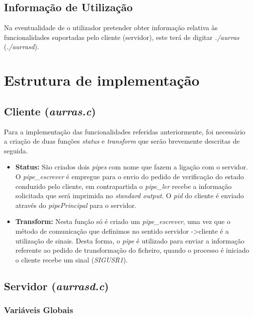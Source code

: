 \documentclass[11pt,a4paper]{report}
\begin{document}
\section{Informação de Utilização}

Na eventualidade de o utilizador pretender obter informação relativa às funcionalidades suportadas pelo cliente (servidor), este terá de digitar \emph{./aurras} (\emph{./aurrasd}). 

\chapter{Estrutura de implementação}

\section{Cliente (\emph{aurras.c})}

Para a implementação das funcionalidades referidas anteriormente, foi necessário a criação de duas funções \emph{status} e \emph{transform} que serão brevemente descritas de seguida.

\begin{itemize}
\item \textbf{Status: } São criados dois \emph{pipes} com nome que fazem a ligação com o servidor. O \emph{pipe\_escrever} é empregue para o envio do pedido de verificação do estado conduzido pelo cliente, em contrapartida o \emph{pipe\_ler} recebe a informação solicitada que será imprimida no \emph{standard output}. O \emph{pid} do cliente é enviado através do \emph{pipePrincipal} para o servidor.
\item \textbf{Transform: } Nesta função só é criado um \emph{pipe\_escrever}, uma vez que o método de comunicação que definimos no sentido servidor -\textgreater cliente é a utilização de sinais. Desta forma, o \emph{pipe} é utilizado para enviar a informação referente ao pedido de transformação do ficheiro, quando o processo é iniciado o cliente recebe um sinal (\emph{SIGUSR1}).
\end{itemize}

\section{Servidor (\emph{aurrasd.c})}

\subsection{Variáveis Globais}
\end{document}
